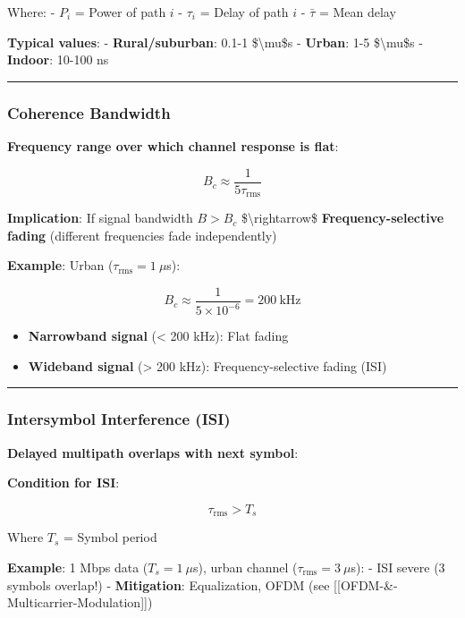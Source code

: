 Where: - \(P_i\) = Power of path \(i\) - \(\tau_i\) = Delay of path
\(i\) - \(\bar{\tau}\) = Mean delay

\textbf{Typical values}: - \textbf{Rural/suburban}: 0.1-1
\$\textbackslash mu\$s - \textbf{Urban}: 1-5 \$\textbackslash mu\$s -
\textbf{Indoor}: 10-100 ns

\begin{center}\rule{0.5\linewidth}{0.5pt}\end{center}

\subsubsection{Coherence Bandwidth}\label{coherence-bandwidth}

\textbf{Frequency range over which channel response is flat}:

\[
B_c \approx \frac{1}{5\tau_{\text{rms}}}
\]

\textbf{Implication}: If signal bandwidth \(B > B_c\)
\$\textbackslash rightarrow\$ \textbf{Frequency-selective fading}
(different frequencies fade independently)

\textbf{Example}: Urban (\(\tau_{\text{rms}} = 1\ \mu\)s):

\[
B_c \approx \frac{1}{5 \times 10^{-6}} = 200\ \text{kHz}
\]

\begin{itemize}
\tightlist
\item
  \textbf{Narrowband signal} (\textless{} 200 kHz): Flat fading
\item
  \textbf{Wideband signal} (\textgreater{} 200 kHz): Frequency-selective
  fading (ISI)
\end{itemize}

\begin{center}\rule{0.5\linewidth}{0.5pt}\end{center}

\subsubsection{Intersymbol Interference
(ISI)}\label{intersymbol-interference-isi}

\textbf{Delayed multipath overlaps with next symbol}:

\textbf{Condition for ISI}:

\[
\tau_{\text{rms}} > T_s
\]

Where \(T_s\) = Symbol period

\textbf{Example}: 1 Mbps data (\(T_s = 1\ \mu\)s), urban channel
(\(\tau_{\text{rms}} = 3\ \mu\)s): - ISI severe (3 symbols overlap!) -
\textbf{Mitigation}: Equalization, OFDM (see
{[}{[}OFDM-\&-Multicarrier-Modulation{]}{]})


